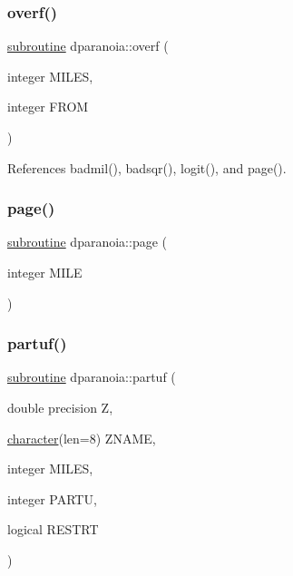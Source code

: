 \mbox{\label{dparanoia_8f90_afbcfc57adfa91735066899a4f2bc8637}} 
\subsubsection{\texorpdfstring{overf()}{overf()}}
{\footnotesize\ttfamily \hyperlink{M__stopwatch_83_8txt_acfbcff50169d691ff02d4a123ed70482}{subroutine} dparanoia\+::overf (\begin{DoxyParamCaption}\item[{integer}]{M\+I\+L\+ES,  }\item[{integer}]{F\+R\+OM }\end{DoxyParamCaption})}



References badmil(), badsqr(), logit(), and page().

\mbox{\label{dparanoia_8f90_a6586ce42b5da5bd64211632cefda8a76}} 
\subsubsection{\texorpdfstring{page()}{page()}}
{\footnotesize\ttfamily \hyperlink{M__stopwatch_83_8txt_acfbcff50169d691ff02d4a123ed70482}{subroutine} dparanoia\+::page (\begin{DoxyParamCaption}\item[{integer}]{M\+I\+LE }\end{DoxyParamCaption})}

\mbox{\label{dparanoia_8f90_abc9aeab695bb0d80eadb75bba822fee2}} 
\subsubsection{\texorpdfstring{partuf()}{partuf()}}
{\footnotesize\ttfamily \hyperlink{M__stopwatch_83_8txt_acfbcff50169d691ff02d4a123ed70482}{subroutine} dparanoia\+::partuf (\begin{DoxyParamCaption}\item[{double precision}]{Z,  }\item[{\hyperlink{option__stopwatch_83_8txt_abd4b21fbbd175834027b5224bfe97e66}{character}(len=8)}]{Z\+N\+A\+ME,  }\item[{integer}]{M\+I\+L\+ES,  }\item[{integer}]{P\+A\+R\+TU,  }\item[{logical}]{R\+E\+S\+T\+RT }\end{DoxyParamCaption})}



